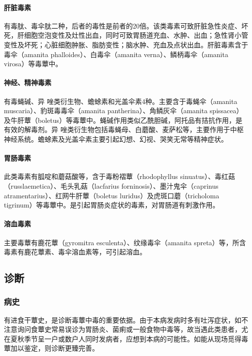 \paragraph{肝脏毒素}

有毒肽、毒伞肽二种，后者的毒性是前者的20倍。该类毒素可致肝脏急性炎症、坏死，肝细胞空泡变性及灶性出血，同时可致胃肠道充血、水肿、出血；急性肾小管变性及坏死；心脏细胞肿胀、脂肪变性；脑水肿、充血及点状出血。肝脏毒素含于毒伞（amanita
phalloides）、白毒伞（amanita verna）、鳞柄毒伞（amanita
virosa）等毒蕈中。

\paragraph{神经、精神毒素}

有毒蝇碱、异{} 唑类衍生物、蟾蜍素和光盖伞素4种。主要含于毒蝇伞（amanita
muscaria）、豹斑毒毒伞（amanita pantherina）、角鳞灰伞（amanita
spissacea）及牛肝蕈（boletus）等毒蕈中。蝇碱作用类似乙酰胆碱，阿托品有拮抗作用，是有效的解毒剂。异{}
唑类衍生物包括毒蝇母、白蘑酸、麦萨松等，主要作用于中枢神经系统。蟾蜍素及光盖伞素主要引起幻想、幻视、哭笑无常等精神症状。

\paragraph{胃肠毒素}

此类毒素有胍啶和蘑菇酸等，含于毒粉褶蕈（rhodophyllus
sinuatus）、毒红菇（russlaemetica）、毛头乳菇（lacfarius
forninosis）、墨汁鬼伞（caprinus atramentarius）、红网牛肝蕈（boletus
luridus）及虎斑口蘑（tricholoma
tigrinum）等毒蕈中。是引起胃肠炎症状的毒素，对胃肠道有刺激作用。

\paragraph{溶血毒素}

主要毒蕈有鹿花蕈（gyromitra esculenta）、纹缘毒伞（amanita
spreta）等，所含毒素有鹿花蕈素、毒伞溶血素等，可引起溶血。

\subsection{诊断}

\subsubsection{病史}

有进食干蕈史，是诊断毒蕈中毒的重要依据。由于本病发病时多有吐泻症状，如不注意询问食蕈史常易误诊为胃肠炎、菌痢或一般食物中毒等，故当遇此类患者，尤在夏秋季节呈一户或数户人同时发病者，应想到本病的可能性。如能从现场觅得毒蕈加以鉴定，则诊断更臻完善。

